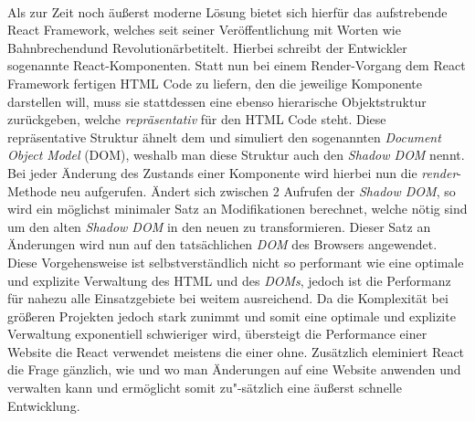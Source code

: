 \paragraph{}Als zur Zeit noch äußerst moderne Lösung bietet sich hierfür das aufstrebende React Framework, welches seit seiner Veröffentlichung mit Worten wie \glqq Bahnbrechend\grqq und \glqq Revolutionär\grqq betitelt.
Hierbei schreibt der Entwickler sogenannte React-Komponenten.
Statt nun bei einem Render-Vorgang dem React Framework fertigen HTML Code zu liefern, den die jeweilige Komponente darstellen will, muss sie stattdessen eine ebenso hierarische Objektstruktur zurückgeben, welche \textit{repräsentativ} für den HTML Code steht.
Diese repräsentative Struktur ähnelt dem und simuliert den sogenannten \textit{Document Object Model} (DOM), weshalb man diese Struktur auch den \textit{Shadow DOM} nennt.
Bei jeder Änderung des Zustands einer Komponente wird hierbei nun die \textit{render}-Methode neu aufgerufen.
Ändert sich zwischen 2 Aufrufen der \textit{Shadow DOM}, so wird ein möglichst minimaler Satz an Modifikationen berechnet, welche nötig sind um den alten \textit{Shadow DOM} in den neuen zu transformieren.
Dieser Satz an Änderungen wird nun auf den tatsächlichen \textit{DOM} des Browsers angewendet. \\

Diese Vorgehensweise ist selbstverständlich nicht so performant wie eine optimale und explizite Verwaltung des HTML und des \textit{DOMs}, jedoch ist die Performanz für nahezu alle Einsatzgebiete bei weitem ausreichend.
Da die Komplexität bei größeren Projekten jedoch stark zunimmt und somit eine optimale und explizite Verwaltung exponentiell schwieriger wird, übersteigt die Performance einer Website die React verwendet meistens die einer ohne.
Zusätzlich eleminiert React die Frage gänzlich, wie und wo man Änderungen auf eine Website anwenden und verwalten kann und ermöglicht somit zu"-sätzlich eine äußerst schnelle Entwicklung.

